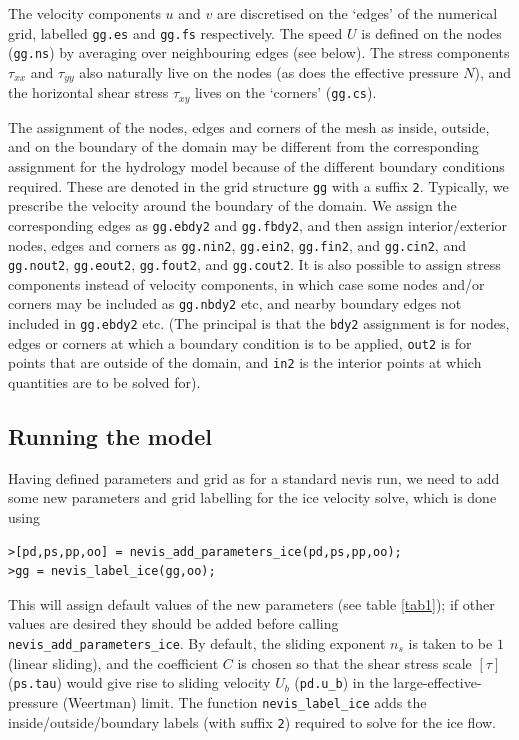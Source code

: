 \documentclass[a4paper,11pt,fleqn]{article}
\begin{document}
{The velocity components $u$ and $v$ are discretised on the `edges' of the numerical grid, labelled \verb|gg.es| and \verb|gg.fs| respectively.  The speed $U$ is defined on the nodes (\verb|gg.ns|) by averaging over neighbouring edges (see below).  The stress components $\tau_{xx}$ and $\tau_{yy}$ also naturally live on the nodes (as does the effective pressure $N$), and the horizontal shear stress $\tau_{xy}$ lives on the `corners' (\verb|gg.cs|).

The assignment of the nodes, edges and corners of the mesh as inside, outside, and on the boundary of the domain may be different from the corresponding assignment for the hydrology model because of the different boundary conditions required.   These are denoted in the grid structure \verb|gg| with a suffix \verb|2|.  Typically, we prescribe the velocity around the boundary of the domain.  We assign the corresponding edges as \verb|gg.ebdy2| and \verb|gg.fbdy2|, and then assign interior/exterior nodes, edges and corners as \verb|gg.nin2|, \verb|gg.ein2|, \verb|gg.fin2|, and \verb|gg.cin2|, and \verb|gg.nout2|, \verb|gg.eout2|, \verb|gg.fout2|, and \verb|gg.cout2|.  It is also possible to assign stress components instead of velocity components, in which case some nodes and/or corners may be included as \verb|gg.nbdy2| etc, and nearby boundary edges not included in \verb|gg.ebdy2| etc.  (The principal is that the \verb|bdy2| assignment is for nodes, edges or corners at which a boundary condition is to be applied, \verb|out2| is for points that are outside of the domain, and \verb|in2| is the interior points at which quantities are to be solved for).

\subsection*{Running the model}

Having defined parameters and grid as for a standard nevis run, we need to add some new parameters and grid labelling for the ice velocity solve, which is done using
\begin{verbatim}
>[pd,ps,pp,oo] = nevis_add_parameters_ice(pd,ps,pp,oo);
>gg = nevis_label_ice(gg,oo);
\end{verbatim}
This will assign default values of the new parameters (see table \ref{tab1}); if other values are desired they should be added before calling \verb|nevis_add_parameters_ice|.  By default, the sliding exponent $n_s$ is taken to be $1$ (linear sliding), and the coefficient $C$ is chosen so that the shear stress scale $[\tau]$ (\verb|ps.tau|) would give rise to sliding velocity $U_b$ (\verb|pd.u_b|) in the large-effective-pressure (Weertman) limit.  
The function \verb|nevis_label_ice| adds the inside/outside/boundary labels (with suffix \verb|2|) required to solve for the ice flow.

}
\end{document}
